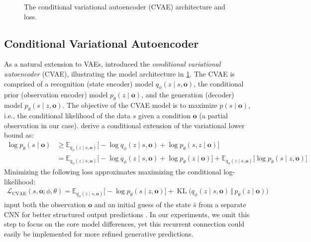 \begin{figure}[t]
    \centering
    \caption{The conditional variational autoencoder (CVAE) architecture and loss.}
    \label{fig:cvae}
\end{figure}

\subsection{Conditional Variational Autoencoder}
As a natural extension to VAEs, \textcite{sohn2015learning} introduced the \textit{conditional variational autoencoder} (CVAE), illustrating the model architecture in \cref{fig:cvae}.
The CVAE is comprised of a recognition (state encoder) model $q_\phi(z \mid s, \mathbf{o})$, the conditional prior (observation encoder) model $p_\theta(z \mid \mathbf{o})$, and the generation (decoder) model $p_\theta(s \mid z, \mathbf{o})$.
The objective of the CVAE model is to maximize $p(s \mid \mathbf{o})$, i.e., the conditional likelihood of the data $s$ given a condition $\mathbf{o}$ (a partial observation in our case).
\textcite{sohn2015learning} derive a conditional extension of the variational lower bound as:
\begin{align}
    \log p_\theta(s \mid \mathbf{o}) &\ge \mathbb{E}_{q_\phi(z \mid s, \mathbf{o})}\big[-\log q_\phi(z \mid s, \mathbf{o}) + \log p_\theta(s, z \mid \mathbf{o})\big] \\
    &= \mathbb{E}_{q_\phi(z \mid s, \mathbf{o})}\big[-\log q_\phi(z \mid s, \mathbf{o}) + \log p_\theta(z \mid \mathbf{o})\big] + \mathbb{E}_{q_\phi(z \mid s, \mathbf{o})}\big[\log p_\theta(s \mid z, \mathbf{o})\big] \nonumber
\end{align}
Minimizing the following loss approximates maximizing the conditional log-likelihood:
\begin{align}
    \mathcal{L}_\text{CVAE}(s, \mathbf{o}; \phi, \theta) = \displaystyle \mathbb{E}_{q_\phi(z \mid s, \mathbf{o})} \big[ -\log p_\theta(s \mid z, \mathbf{o}) \big] + \operatorname{KL}\!\big(q_\phi(z \mid s, \mathbf{o}) \,\Vert\, p_\theta(z \mid \mathbf{o})\big)
\end{align}
\textcite{sohn2015learning} input both the observation $\mathbf{o}$ and an initial guess of the state $\hat{s}$ from a separate CNN for better structured output predictions \cite{pinheiro2014recurrent,sohn2014improved}. In our experiments, we omit this step to focus on the core model differences, yet this recurrent connection could easily be implemented for more refined generative predictions.

